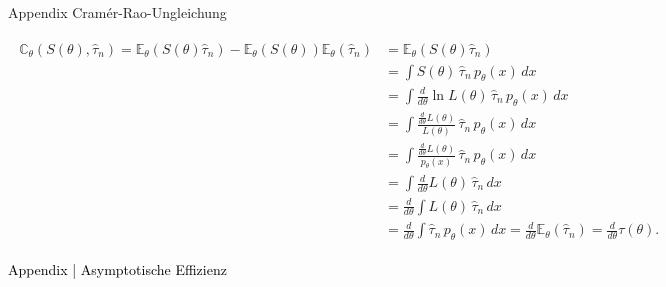 \documentclass[
  8pt,
  ignorenonframetext,
]{beamer}
\begin{document}
\begin{frame}{Appendix \textbar{} Cramér-Rao-Ungleichung}
\protect\hypertarget{appendix-cramuxe9r-rao-ungleichung-19}{}
\begin{tiny}
\begin{align}
\begin{split}
\mathbb{C}_\theta(S(\theta),\hat{\tau}_n)
  = \mathbb{E}_\theta(S(\theta)\hat{\tau}_n)
   - \mathbb{E}_\theta(S(\theta))\mathbb{E}_\theta(\hat{\tau}_n)
&  = \mathbb{E}_\theta(S(\theta)\hat{\tau}_n) \\
& = \int S(\theta)\,\hat{\tau}_n\,p_\theta(x) \,dx \\
& = \int \frac{d}{d\theta} \ln L(\theta)\,\hat{\tau}_n\,p_\theta(x) \,dx \\
& = \int \frac{\frac{d}{d\theta} L(\theta)}{L(\theta)}\,\hat{\tau}_n\,p_\theta(x) \,dx \\
& = \int \frac{\frac{d}{d\theta} L(\theta)}{p_\theta(x)}\,\hat{\tau}_n\,p_\theta(x) \,dx \\
& = \int \frac{d}{d\theta} L(\theta)\, \hat{\tau}_n  \,dx \\
& = \frac{d}{d\theta} \int L(\theta)\, \hat{\tau}_n  \,dx \\
& = \frac{d}{d\theta} \int \hat{\tau}_n\, p_\theta(x) \,dx
  = \frac{d}{d\theta} \mathbb{E}_\theta(\hat{\tau}_n)
  = \frac{d}{d\theta} \tau(\theta).
\end{split}
\end{align}
\end{tiny}
\end{frame}

\begin{frame}[plain]{}
\protect\hypertarget{section-16}{}
\vfill
\center
\huge

\textcolor{black}{Appendix | Asymptotische Effizienz} \vfill
\end{frame}
\end{document}
